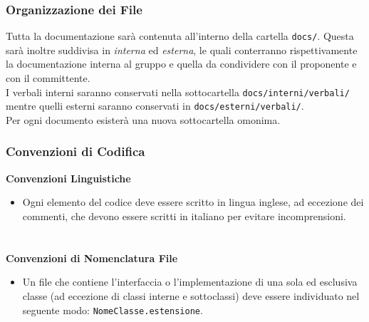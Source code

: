 \documentclass[a4paper, 12pt]{article}
\begin{document}
\subsubsection{Organizzazione dei File}
Tutta la documentazione sarà contenuta all'interno della cartella \texttt{docs/}. Questa sarà inoltre suddivisa in \textit{interna} ed \textit{esterna}, le quali conterranno rispettivamente la documentazione interna al gruppo e quella da condividere con il proponente e con il committente. \\
I verbali interni saranno conservati nella sottocartella \texttt{docs/interni/verbali/} mentre quelli esterni saranno conservati in \texttt{docs/esterni/verbali/}.\\
Per ogni documento esisterà una nuova sottocartella omonima.

\subsubsection{Convenzioni di Codifica}
\textbf{Convenzioni Linguistiche} \newline
\begin{itemize}
    \item Ogni elemento del codice deve essere scritto in lingua inglese, ad eccezione dei commenti, che devono essere scritti in italiano per evitare incomprensioni.
\end{itemize}
\paragraph{}\\
\textbf{Convenzioni di Nomenclatura File}
\begin{itemize}
    \item Un file che contiene l'interfaccia o l'implementazione di una sola ed esclusiva classe (ad eccezione di classi interne e sottoclassi) deve essere individuato nel seguente modo: \texttt{NomeClasse.estensione}.
\end{itemize}
\end{document}
